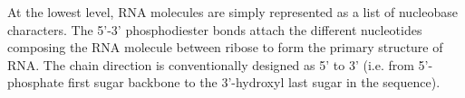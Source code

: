 
At the lowest level, RNA molecules are simply represented as a list of nucleobase characters. The 5'-3' phosphodiester bonds attach the different nucleotides composing the RNA molecule between ribose to form the primary structure of RNA. The chain direction is conventionally designed as 5' to 3' (i.e. from 5'-phosphate first sugar backbone to the 3'-hydroxyl last sugar in the sequence). 

